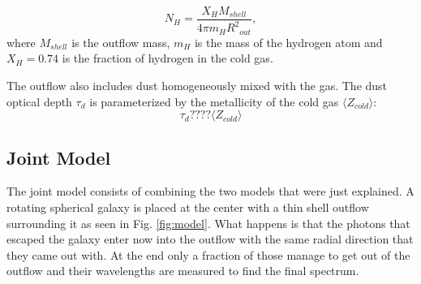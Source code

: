\documentclass{latex/emulateapj}
\begin{document}
\begin{equation}
\label{eq:nh}
N_H = \frac{X_H M_{shell}}{4\pi m_H {R^2}_{out}},
\end{equation}
%
where $M_{shell}$ is the outflow mass, $m_H$ is the mass of the hydrogen atom and $X_H=0.74$ is the fraction of hydrogen in the cold gas.

The outflow also includes dust homogeneously mixed with the gas. The dust optical depth $\tau_d$ is parameterized by the metallicity of the cold gas $\langle Z_{cold} \rangle$: 
\begin{equation}
\label{eq:z}
\tau_{d} ???? \langle Z_{cold} \rangle
\end{equation}



\subsection{Joint Model}

The joint model consists of combining the two models that were just explained. A rotating spherical galaxy is placed at the center with a thin shell outflow surrounding it as seen in Fig. \ref{fig:model}. What happens is that the photons that escaped the galaxy enter now into the outflow with the same radial direction that they came out with. At the end only a fraction of those manage to get out of the outflow and their wavelengths are measured to find the
final spectrum. 
\end{document}

